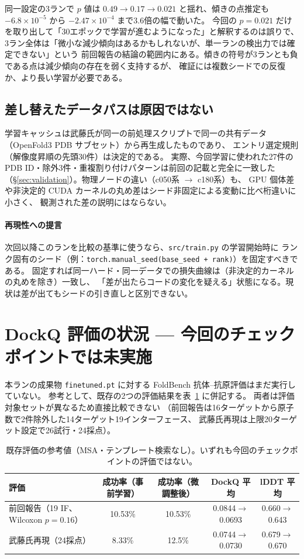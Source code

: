\documentclass[11pt]{article}
\begin{document}
同一設定の3ランで $p$ 値は $0.49 \to 0.17 \to 0.021$ と揺れ、傾きの点推定も
$-6.8\times10^{-5}$ から $-2.47\times10^{-4}$ まで3.6倍の幅で動いた。
今回の $p=0.021$ だけを取り出して「30エポックで学習が進むようになった」と解釈するのは誤りで、
3ラン全体は「微小な減少傾向はあるかもしれないが、単一ランの検出力では確定できない」という
前回報告の結論の範囲内にある。傾きの符号が3ランとも負である点は減少傾向の存在を弱く支持するが、
確証には複数シードでの反復か、より長い学習が必要である。

\subsection{差し替えたデータパスは原因ではない}

学習キャッシュは武藤氏が同一の前処理スクリプトで同一の共有データ
（OpenFold3 PDB サブセット）から再生成したものであり、
エントリ選定規則（解像度昇順の先頭30件）は決定的である。
実際、今回学習に使われた27件の PDB ID・除外3件・重複割り付けパターンは前回の記載と完全に一致した
（\S\ref{sec:validation}）。物理ノードの違い（c050系 $\to$ c180系）も、
GPU 個体差や非決定的 CUDA カーネルの丸め差はシード非固定による変動に比べ桁違いに小さく、
観測された差の説明にはならない。

\paragraph{再現性への提言}
次回以降このランを比較の基準に使うなら、\texttt{src/train.py} の学習開始時に
ランク固有のシード（例：\texttt{torch.manual\_seed(base\_seed + rank)}）を固定すべきである。
固定すれば同一ハード・同一データでの損失曲線は（非決定的カーネルの丸めを除き）一致し、
「差が出たらコードの変化を疑える」状態になる。現状は差が出てもシードの引き直しと区別できない。

\section{DockQ 評価の状況 --- 今回のチェックポイントでは未実施}
\label{sec:eval}

本ランの成果物 \texttt{finetuned.pt} に対する FoldBench 抗体--抗原評価はまだ実行していない。
参考として、既存の2つの評価結果を表~\ref{tab:dockq} に併記する。
両者は評価対象セットが異なるため直接比較できない
（前回報告は16ターゲットから原子数で2件除外した14ターゲット19インターフェース、
武藤氏再現は上限20ターゲット設定で26試行・24採点）。

\begin{table}[h]
\centering
\caption{既存評価の参考値（MSA・テンプレート検索なし）。いずれも今回のチェックポイントの評価ではない。}
\label{tab:dockq}
\small
\begin{tabular}{@{}lcccc@{}}
\toprule
評価 & 成功率（事前学習） & 成功率（微調整後） & DockQ 平均 & lDDT 平均 \\
\midrule
前回報告（19 IF、Wilcoxon $p=0.16$） & 10.53\% & 10.53\% & 0.0844$\to$0.0693 & 0.660$\to$0.643 \\
武藤氏再現（24採点） & 8.33\% & 12.5\% & 0.0744$\to$0.0730 & 0.679$\to$0.670 \\
\bottomrule
\end{tabular}
\end{table}
\end{document}
